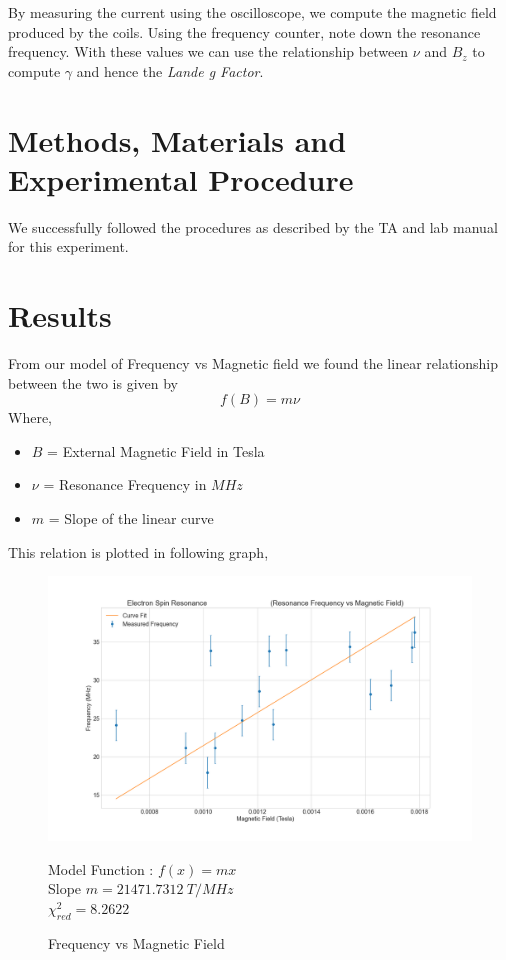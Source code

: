 \documentclass[letterpaper,12pt]{article}
\begin{document}
By measuring the current using the oscilloscope, we compute the magnetic field produced by the coils. Using the frequency counter, note down the
resonance frequency. With these values we can use the relationship between $\nu$ and $B_z$ to compute $\gamma$ and hence the 
\emph{Lande g Factor}.

\section{Methods, Materials and Experimental Procedure}

We successfully followed the procedures as described by the TA and lab manual \cite{lab-manual-ex6} for this experiment.

\section{Results}

From our model of Frequency vs Magnetic field we found the linear relationship between the two is given 
by 
$$f(B) = m\nu$$
Where,
\begin{itemize}
  \item[] $B$ = External Magnetic Field in Tesla
  \item[] $\nu$ = Resonance Frequency in $MHz$
  \item[] $m$ = Slope of the linear curve 
\end{itemize}

This relation is plotted in following graph,

\begin{figure}[H]
  \centering
  \includegraphics[width=0.95\linewidth]{../code/Pankaj/lab6_freq_vs_magnetic_field.png}    
  \begin{center}
    \begin{center}
      Model Function : $f(x) = mx$ \\
      Slope $m = 21471.7312\ T/MHz$\\
      $\chi_{red}^2 = 8.2622$
    \end{center}  \end{center}
  \caption{Frequency vs Magnetic Field}
  \label{frq-vs-b}
\end{figure}
\end{document}
